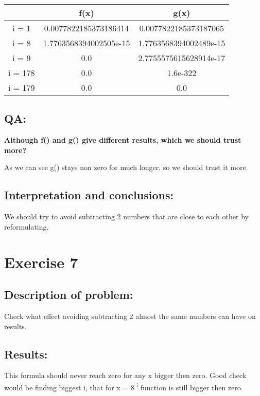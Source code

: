 \documentclass{article}
\begin{document}
\begin{center}
    \begin{tabular}{| c | c | c |}
        \hline
         & f(x) & g(x)\\ 
        \hline
        i = 1 & 0.0077822185373186414 & 0.0077822185373187065\\
        \hline
        i = 8 & 1.7763568394002505e-15 & 1.7763568394002489e-15\\
        \hline
        i = 9 & 0.0 & 2.7755575615628914e-17\\
        \hline
        i = 178 & 0.0 & 1.6e-322\\
        \hline
        i = 179 & 0.0 & 0.0\\
        \hline
    \end{tabular}
    \end{center}
    \subsection*{QA:}

    \begin{center}
        \textbf{Although f() and g() give different results, which we should trust more?}
    \end{center}
    As we can see g() stays non zero for much longer, so we should trust it more.

    \subsection*{Interpretation and conclusions:}
We should try to avoid subtracting 2 numbers that are close to each other by reformulating.

\section*{Exercise 7}
\subsection*{Description of problem:}
Check what effect avoiding subtracting 2 almost the same numbers can have on results.

\subsection*{Results:}
This formula should never reach zero for any x bigger then zero. Good check would be finding biggest i, that for x = 8\textsuperscript{-i} function is still bigger then zero.
\end{document}

